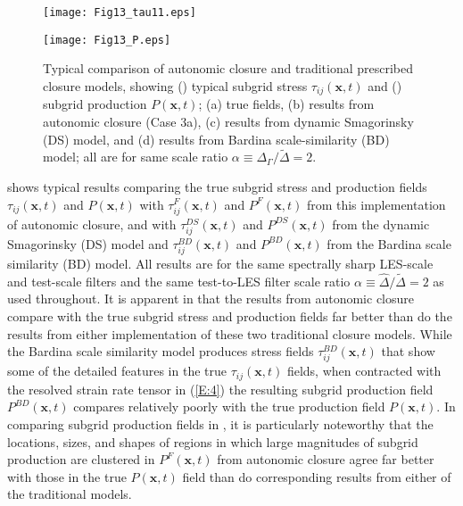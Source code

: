 %
\begin{figure}
\begin{minipage}[b]{\linewidth}
	\centering \hspace{1.5cm}
	\texttt{[image: Fig13\_tau11.eps]}
	 \label{F:13a}
\end{minipage}%
\vspace{0.5cm}
\begin{minipage}[b]{\linewidth}
	\centering \hspace{1.5cm}
	\texttt{[image: Fig13\_P.eps]}
	\label{F:13b}
\end{minipage}
\caption{Typical comparison of autonomic closure and traditional prescribed closure models, showing () typical subgrid stress $\tau_{ij}(\mathbf{x},t)$ and () subgrid production $P(\mathbf{x},t)$; (a) true fields, (b) results from autonomic closure (Case 3a), (c) results from dynamic Smagorinsky (DS) model, and (d) results from Bardina scale-similarity (BD) model; all are for same scale ratio $\alpha \equiv \Delta_{\Gamma} / \widetilde{\Delta} = 2$.}
\label{F:13}
\end{figure}
%
%



 shows typical results comparing the true subgrid stress and production fields $\tau_{ij}(\mathbf{x},t)$  and  $P(\mathbf{x},t)$ with  $\tau_{ij}^{F}(\mathbf{x},t)$  and  $P^{F}(\mathbf{x},t)$   from this implementation of autonomic closure, and with  $\tau_{ij}^{DS}(\mathbf{x},t)$  and  $P^{DS}(\mathbf{x},t)$   from the dynamic Smagorinsky (DS) model and   $\tau_{ij}^{BD}(\mathbf{x},t)$  and  $P^{BD}(\mathbf{x},t)$  from the Bardina scale similarity (BD) model. All results are for the same spectrally sharp LES-scale and test-scale filters and the same test-to-LES filter scale ratio $\alpha \equiv \widehat{\Delta}/ \widetilde{\Delta} = 2$  as used throughout. It is apparent in  that the results from autonomic closure compare with the true subgrid stress and production fields far better than do the results from either implementation of these two traditional closure models. While the Bardina scale similarity model produces stress fields  $\tau_{ij}^{BD}(\mathbf{x},t)$  that show some of the detailed features in the true $\tau_{ij}(\mathbf{x},t)$ fields, when contracted with the resolved strain rate tensor in (\ref{E:4}) the resulting subgrid production field $P^{BD}(\mathbf{x},t)$ compares relatively poorly with the true production field $P(\mathbf{x},t)$. In comparing subgrid production fields in , it is particularly noteworthy that the locations, sizes, and shapes of regions in which large magnitudes of subgrid production are clustered in $P^{F}(\mathbf{x},t)$  from autonomic closure agree far better with those in the true  $P(\mathbf{x},t)$ field than do corresponding results from either of the traditional models. 

